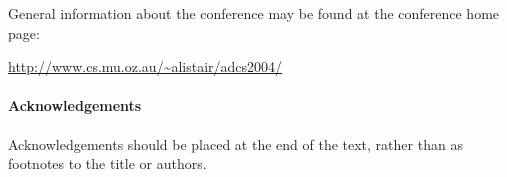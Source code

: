 \documentclass[twocolumn]{article}
\begin{document}
General information about the conference may be found at the
conference home page: 

\begin{center}
\url{http://www.cs.mu.oz.au/~alistair/adcs2004/}
\end{center}

\paragraph*{Acknowledgements}

Acknowledgements should be placed at the end of the text,
rather than as footnotes to the title or authors.

\begin{small}

\end{small}
\end{document}
